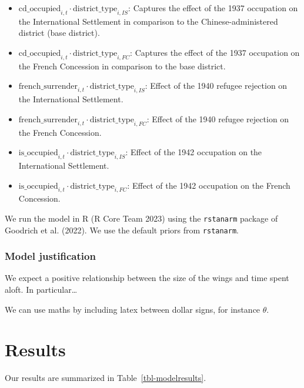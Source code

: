 \documentclass[
  letterpaper,
  DIV=11,
  numbers=noendperiod]{scrartcl}
\providecommand{\tightlist}{%
  \setlength{\itemsep}{0pt}\setlength{\parskip}{0pt}}\usepackage{longtable,booktabs,array}
\begin{document}
\begin{itemize}
\tightlist
\item
  \(\mbox{cd_occupied}_{i,t} \cdot \mbox{district_type}_{i, IS}\):
  Captures the effect of the 1937 occupation on the International
  Settlement in comparison to the Chinese-administered district (base
  district).
\item
  \(\mbox{cd_occupied}_{i,t} \cdot \mbox{district_type}_{i, FC}\):
  Captures the effect of the 1937 occupation on the French Concession in
  comparison to the base district.
\item
  \(\mbox{french_surrender}_{i,t} \cdot \mbox{district_type}_{i, IS}\):
  Effect of the 1940 refugee rejection on the International Settlement.
\item
  \(\mbox{french_surrender}_{i,t} \cdot \mbox{district_type}_{i, FC}\):
  Effect of the 1940 refugee rejection on the French Concession.
\item
  \(\mbox{is_occupied}_{i,t} \cdot \mbox{district_type}_{i, IS}\):
  Effect of the 1942 occupation on the International Settlement.
\item
  \(\mbox{is_occupied}_{i,t} \cdot \mbox{district_type}_{i, FC}\):
  Effect of the 1942 occupation on the French Concession.
\end{itemize}

We run the model in R (R Core Team 2023) using the \texttt{rstanarm}
package of Goodrich et al. (2022). We use the default priors from
\texttt{rstanarm}.

\hypertarget{model-justification}{%
\subsubsection{Model justification}\label{model-justification}}

We expect a positive relationship between the size of the wings and time
spent aloft. In particular\ldots{}

We can use maths by including latex between dollar signs, for instance
\(\theta\).

\hypertarget{results}{%
\section{Results}\label{results}}

Our results are summarized in Table~\ref{tbl-modelresults}.
\end{document}
